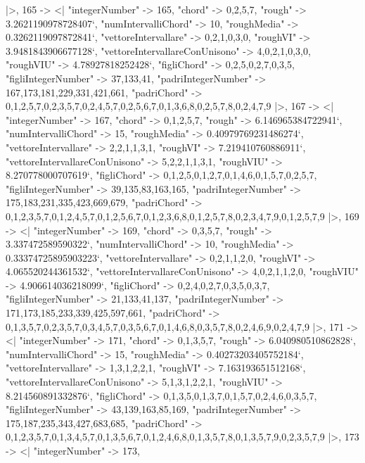 \documentclass[
]{article}
\begin{document}
\begin{DatasetVerbatim}
  |>,
  165 -> <|
    "integerNumber" -> 165,
    "chord" -> {0,2,5,7},
    "rough" -> 3.2621190978728407`,
    "numIntervalliChord" -> 10,
    "roughMedia" -> 0.3262119097872841`,
    "vettoreIntervallare" -> {0,2,1,0,3,0},
    "roughVI" -> 3.9481843906677128`,
    "vettoreIntervallareConUnisono" -> {4,0,2,1,0,3,0},
    "roughVIU" -> 4.78927818252428`,
    "figliChord" -> {{0,2,5},{0,2,7},{0,3,5}},
    "figliIntegerNumber" -> {37,133,41},
    "padriIntegerNumber" -> {167,173,181,229,331,421,661},
    "padriChord" -> {{0,1,2,5,7},{0,2,3,5,7},{0,2,4,5,7},{0,2,5,6,7},{0,1,3,6,8},{0,2,5,7,8},{0,2,4,7,9}}
  |>,
  167 -> <|
    "integerNumber" -> 167,
    "chord" -> {0,1,2,5,7},
    "rough" -> 6.146965384722941`,
    "numIntervalliChord" -> 15,
    "roughMedia" -> 0.40979769231486274`,
    "vettoreIntervallare" -> {2,2,1,1,3,1},
    "roughVI" -> 7.219410760886911`,
    "vettoreIntervallareConUnisono" -> {5,2,2,1,1,3,1},
    "roughVIU" -> 8.270778000707619`,
    "figliChord" -> {{0,1,2,5},{0,1,2,7},{0,1,4,6},{0,1,5,7},{0,2,5,7}},
    "figliIntegerNumber" -> {39,135,83,163,165},
    "padriIntegerNumber" -> {175,183,231,335,423,669,679},
    "padriChord" -> {{0,1,2,3,5,7},{0,1,2,4,5,7},{0,1,2,5,6,7},{0,1,2,3,6,8},{0,1,2,5,7,8},{0,2,3,4,7,9},{0,1,2,5,7,9}}
  |>,
  169 -> <|
    "integerNumber" -> 169,
    "chord" -> {0,3,5,7},
    "rough" -> 3.337472589590322`,
    "numIntervalliChord" -> 10,
    "roughMedia" -> 0.33374725895903223`,
    "vettoreIntervallare" -> {0,2,1,1,2,0},
    "roughVI" -> 4.065520244361532`,
    "vettoreIntervallareConUnisono" -> {4,0,2,1,1,2,0},
    "roughVIU" -> 4.906614036218099`,
    "figliChord" -> {{0,2,4},{0,2,7},{0,3,5},{0,3,7}},
    "figliIntegerNumber" -> {21,133,41,137},
    "padriIntegerNumber" -> {171,173,185,233,339,425,597,661},
    "padriChord" -> {{0,1,3,5,7},{0,2,3,5,7},{0,3,4,5,7},{0,3,5,6,7},{0,1,4,6,8},{0,3,5,7,8},{0,2,4,6,9},{0,2,4,7,9}}
  |>,
  171 -> <|
    "integerNumber" -> 171,
    "chord" -> {0,1,3,5,7},
    "rough" -> 6.040980510862828`,
    "numIntervalliChord" -> 15,
    "roughMedia" -> 0.40273203405752184`,
    "vettoreIntervallare" -> {1,3,1,2,2,1},
    "roughVI" -> 7.163193651512168`,
    "vettoreIntervallareConUnisono" -> {5,1,3,1,2,2,1},
    "roughVIU" -> 8.214560891332876`,
    "figliChord" -> {{0,1,3,5},{0,1,3,7},{0,1,5,7},{0,2,4,6},{0,3,5,7}},
    "figliIntegerNumber" -> {43,139,163,85,169},
    "padriIntegerNumber" -> {175,187,235,343,427,683,685},
    "padriChord" -> {{0,1,2,3,5,7},{0,1,3,4,5,7},{0,1,3,5,6,7},{0,1,2,4,6,8},{0,1,3,5,7,8},{0,1,3,5,7,9},{0,2,3,5,7,9}}
  |>,
  173 -> <|
    "integerNumber" -> 173,

\end{DatasetVerbatim}
\end{document}
